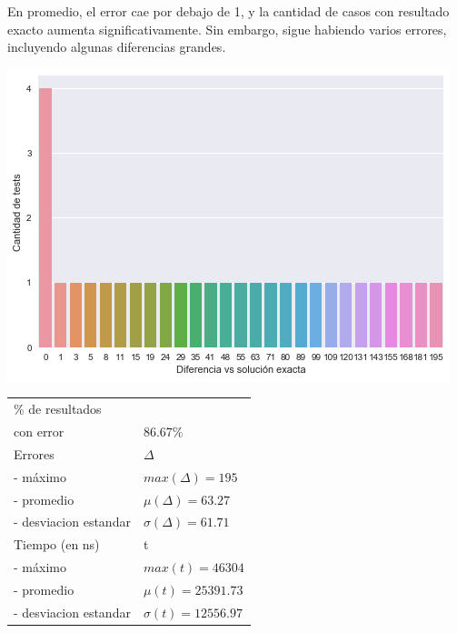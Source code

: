 En promedio, el error cae por debajo de 1, y la cantidad de casos con resultado exacto aumenta significativamente. Sin embargo, sigue habiendo varios errores, incluyendo algunas diferencias grandes.

\noindent
\begin{minipage}{0.55\textwidth}
    \hfill
    \includegraphics[scale=0.6]{img/path-local.png}
\end{minipage}
\hfill
\begin{minipage}{0.44\textwidth}
    \begin{center}

        \begin{tabular}{ | l l |}
            \hline
            \% de resultados & \\
            con error & 86.67\% \\ \hline
            Errores & $\Delta$ \\
            - máximo & $max(\Delta) = 195$ \\
            - promedio & $\mu(\Delta) = 63.27$ \\
            - desviacion estandar & $\sigma(\Delta) = 61.71$ \\ \hline
            Tiempo (en ns) & t \\
            - máximo & $max(t) = 46304 $ \\
            - promedio & $\mu(t) = 25391.73$ \\
            - desviacion estandar & $\sigma(t) = 12556.97$ \\
            \hline
        \end{tabular}
    \end{center}
\end{minipage}

